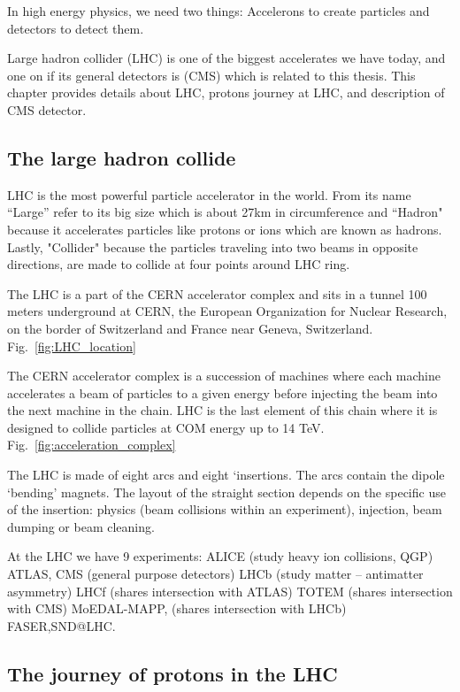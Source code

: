 

In high energy physics, we need two things: Accelerons to create particles and detectors to detect them.

Large hadron collider (LHC) is one of the biggest accelerates we have today, and one on if its general detectors is (CMS) which is related to this thesis. This chapter provides details about LHC, protons journey at LHC, and description of CMS detector. 

\subsection{The large hadron collide}

LHC is the most powerful particle accelerator in the world. From its name “Large” refer to its big size which is about 27km in circumference and “Hadron" because it accelerates particles like protons or ions which are known as hadrons. Lastly, "Collider" because the particles traveling into two beams in opposite directions, are made to collide at four points around LHC ring.

The LHC is a part of the CERN accelerator complex and sits in a tunnel 100 meters underground at CERN, the European Organization for Nuclear Research, on the border of Switzerland and France near Geneva, Switzerland. Fig.~\ref{fig:LHC_location}

The CERN accelerator complex is a succession of machines where each machine accelerates a beam of particles to a given energy before injecting the beam into the next machine in the chain. LHC is the last element of this chain where it is designed to collide particles at COM energy up to 14 TeV. Fig.~\ref{fig:acceleration_complex}

The LHC is made of eight arcs and eight ‘insertions. The arcs contain the dipole ‘bending’ magnets. The layout of the straight section depends on the specific use of the insertion: physics (beam collisions within an experiment), injection, beam dumping or beam cleaning.

At the LHC we have 9 experiments: 
ALICE (study heavy ion collisions, QGP)  
ATLAS, CMS  (general purpose detectors)  
LHCb (study matter – antimatter asymmetry) 
 LHCf (shares intersection with ATLAS) 
TOTEM (shares intersection with CMS)  
MoEDAL-MAPP, (shares intersection with LHCb) 
FASER,SND@LHC.


\subsection{The journey of protons in the LHC}

